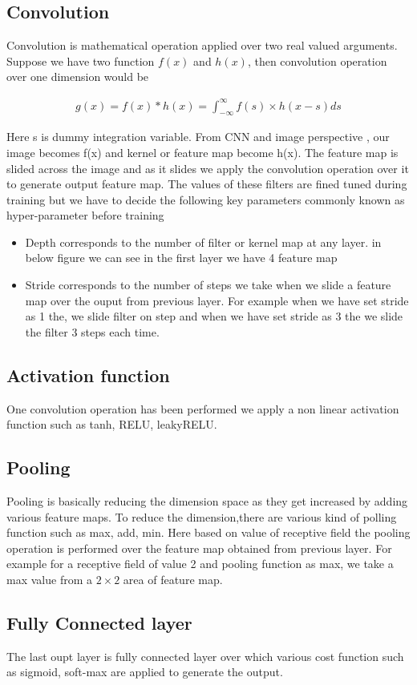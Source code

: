 \subsection{Convolution}

Convolution is mathematical operation applied over two real valued arguments. Suppose we have two function $f(x)$ and $h(x)$, then convolution operation over one dimension would be 

 \begin{equation}\label{eq:convolution-1d}
        \begin{aligned}
            g(x)=f(x) \ast h(x) = \int_{-\infty }^{\infty} f(s) \times h(x-s) ds
        \end{aligned}
\end{equation}

Here s is dummy integration variable. 
From CNN and image perspective , our image becomes f(x) and kernel or feature map become h(x). The feature map is slided across the image and as it slides we apply the convolution operation over it to generate output feature map. The values of these filters are fined tuned during training but we have to decide the following key parameters commonly known as hyper-parameter before training
\begin{itemize}
    \item  Depth corresponds to the number of filter or kernel map at any layer. in below figure we can see in the first layer we have 4 feature map
    \item Stride corresponds to the number of steps we take when we slide a feature map over the ouput from previous layer. For example when we have set stride as 1 the, we slide filter on step and when we have set stride as 3 the we slide the filter 3 steps each time.
\end{itemize}

\subsection{ Activation function}
One convolution operation has been performed we apply a non linear activation function such as tanh, RELU, leakyRELU.

\subsection{Pooling}
Pooling is basically reducing the dimension space as they get increased by adding various feature maps. To reduce the dimension,there are various kind of polling function such as max, add, min. Here based on value of receptive field the pooling operation is performed over the feature map obtained from previous layer. For example for a receptive field of value 2 and pooling function as max, we take a max value from a $2 \times 2$ area of feature map.


\subsection{Fully Connected layer}
The last oupt layer is fully connected layer over which various cost function such as sigmoid, soft-max are applied to generate the output.